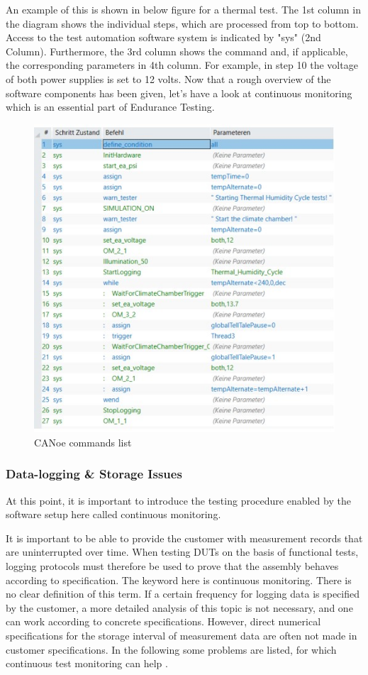 An example of this is shown in below figure for a thermal test. The 1st column in the diagram shows the individual steps, which are processed from top to bottom. Access to the test automation software system is indicated by "sys" (2nd Column). Furthermore, the 3rd column shows the command and, if applicable, the corresponding parameters in 4th column. For example, in step 10 the voltage of both power supplies is set to 12 volts. Now that a rough overview of the software components has been given, let's have a look at continuous monitoring which is an essential part of Endurance Testing. 

\begin{figure}[H]
	\centering
	\includegraphics[width= 1\textwidth]{images/CANoe variable system.jpg}
	\caption{CANoe commands list }  
	\label{fig:CANoe commands list}
\end{figure}
\newpage
\subsubsection{Data-logging \& Storage Issues} \label{datalog}

At this point, it is important to introduce the testing procedure enabled by the software setup here called continuous monitoring. 

It is important to be able to provide the customer with measurement records that are uninterrupted over time. When testing DUTs on the basis of functional tests, logging protocols must therefore be used to prove that the assembly behaves according to specification. The keyword here is continuous monitoring. There is no clear definition of this term. If a certain frequency for logging data is specified by the customer, a more detailed analysis of this topic is not necessary, and one can work according to concrete specifications. However, direct numerical specifications for the storage interval of measurement data are often not made in customer specifications. In the following some problems are listed, for which continuous test monitoring can help \cite{ctm}.

